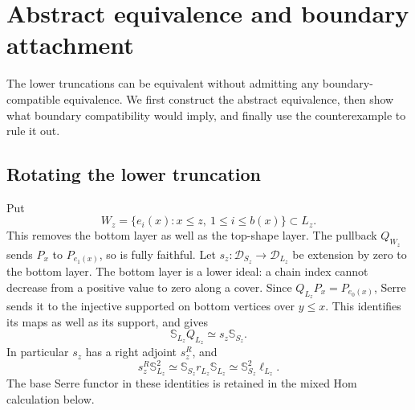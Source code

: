 \documentclass[11pt]{article}
\theoremstyle{definition}
\begin{document}
\section{Abstract equivalence and boundary attachment}
\label{sec:boundary}
The lower truncations can be equivalent without admitting any
boundary-compatible equivalence. We first construct the abstract
equivalence, then show what boundary compatibility would imply,
and finally use the counterexample to rule it out.

\subsection{Rotating the lower truncation}
Put
\[
 W_z=\{e_i(x):x\leq z,\ 1\leq i\leq b(x)\}\subset L_z.
\]
This removes the bottom layer as well as the top-shape layer.
The pullback $Q_{W_z}$ sends $P_x$ to $P_{e_1(x)}$, so is fully
faithful. Let $s_z:\mathcal D_{S_z}\to\mathcal D_{L_z}$ be
extension by zero to the bottom layer. The bottom layer is a lower ideal: a chain index cannot decrease
from a positive value to zero along a cover. Since
$Q_{L_z}P_x=P_{e_0(x)}$, Serre sends it to the injective supported
on bottom vertices over $y\leq x$. This identifies its maps as
well as its support, and gives
\begin{equation}\label{eq:bottom-serre}
 \mathbb S_{L_z}Q_{L_z}\simeq s_z\mathbb S_{S_z}.
\end{equation}
In particular $s_z$ has a right adjoint $s_z^R$, and
\begin{equation}\label{eq:bottom-adjoint}
 s_z^R\mathbb S_{L_z}^2
 \simeq\mathbb S_{S_z}r_{L_z}\mathbb S_{L_z}
 \simeq\mathbb S_{S_z}^2\ell_{L_z}.
\end{equation}
The base Serre functor in these identities is retained in the
mixed Hom calculation below.
\end{document}
